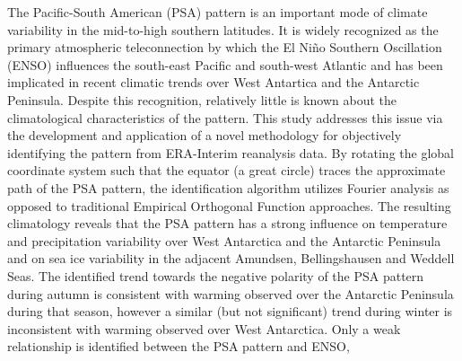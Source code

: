 The Pacific-South American (PSA) pattern is an important mode of climate variability in the mid-to-high southern latitudes. It is widely recognized as the primary atmospheric teleconnection by which the El Ni\~{n}o Southern Oscillation (ENSO) influences the south-east Pacific and south-west Atlantic and has been implicated in recent climatic trends over West Antartica and the Antarctic Peninsula. Despite this recognition, relatively little is known about the climatological characteristics of the pattern. This study addresses this issue via the development and application of a novel methodology for objectively identifying the pattern from ERA-Interim reanalysis data. By rotating the global coordinate system such that the equator (a great circle) traces the approximate path of the PSA pattern, the identification algorithm utilizes Fourier analysis as opposed to traditional Empirical Orthogonal Function approaches. The resulting climatology reveals that the PSA pattern has a strong influence on temperature and precipitation variability over West Antarctica and the Antarctic Peninsula and on sea ice variability in the adjacent Amundsen, Bellingshausen and Weddell Seas. The identified trend towards the negative polarity of the PSA pattern during autumn is consistent with warming observed over the Antarctic Peninsula during that season, however a similar (but not significant) trend during winter is inconsistent with warming observed over West Antarctica. Only a weak relationship is identified between the PSA pattern and ENSO, 